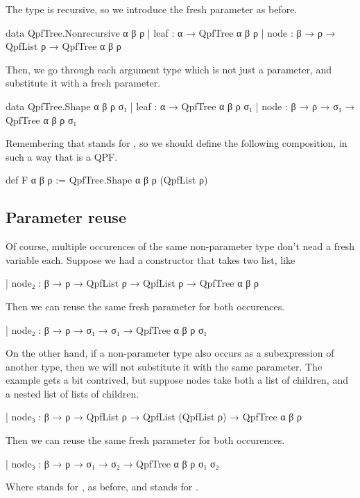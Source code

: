The type is recursive, so we introduce the fresh parameter as before.
\begin{leancode}
    data QpfTree.Nonrecursive α β ρ
      | leaf : α → QpfTree α β ρ
      | node : β → ρ → QpfList ρ → QpfTree α β ρ
\end{leancode}

Then, we go through each argument type which is not just a parameter, and substitute
it with a fresh parameter.

\begin{leancode}
    data QpfTree.Shape α β ρ σ₁
      | leaf : α → QpfTree α β ρ σ₁
      | node : β → ρ → σ₁ → QpfTree α β ρ σ₁
\end{leancode}
Remembering that  stands for , so we should define the following 
composition, in such a way that  is a QPF.
\begin{leancode}
    def F α β ρ := QpfTree.Shape α β ρ (QpfList ρ)
\end{leancode}


\subsection{Parameter reuse}
Of course, multiple occurences of the same non-parameter type don't nead a fresh variable each.
Suppose we had a constructor that takes two list, like
\begin{leancode}
    | node₂ : β → ρ → QpfList ρ → QpfList ρ → QpfTree α β ρ
\end{leancode}
Then we can reuse the same fresh parameter  for both occurences.
\begin{leancode}
    | node₂ : β → ρ → σ₁ → σ₁ → QpfTree α β ρ σ₁
\end{leancode}

On the other hand, if a non-parameter type also occurs as a subexpression of another type, then
we will not substitute it with the same parameter.
The example gets a bit contrived, but suppose nodes take both a list of children, and a nested list 
of lists of children.
\begin{leancode}
    | node₃ : β → ρ → QpfList ρ → QpfList (QpfList ρ) → QpfTree α β ρ
\end{leancode}
Then we can reuse the same fresh parameter  for both occurences.
\begin{leancode}
    | node₃ : β → ρ → σ₁ → σ₂ → QpfTree α β ρ σ₁ σ₂
\end{leancode}
Where  stands for , as before, and  stands for 
.



